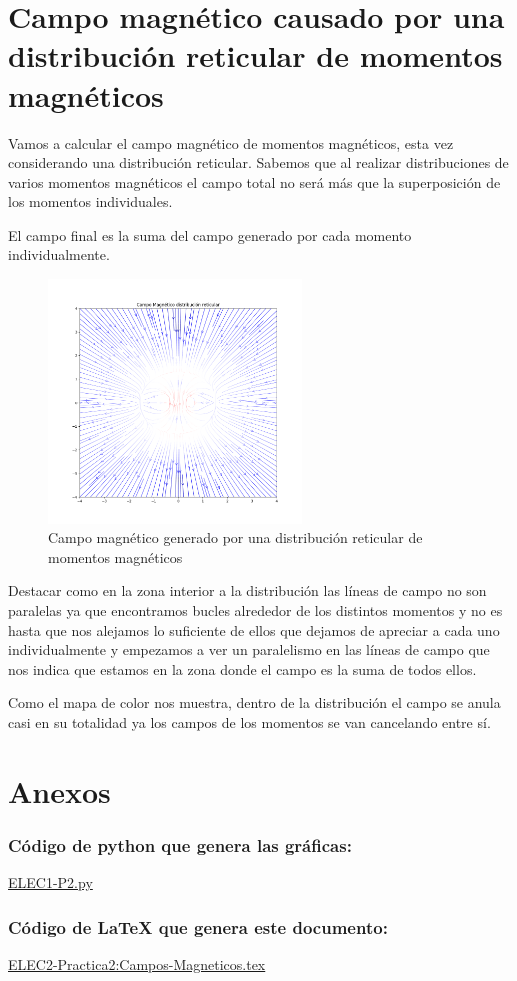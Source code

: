 \documentclass[11pt]{article}
\begin{document}
\section{Campo magnético causado por una distribución reticular de momentos magnéticos}
Vamos a calcular el campo magnético de momentos magnéticos, esta vez considerando una distribución reticular. Sabemos que al realizar distribuciones de varios momentos magnéticos el campo total no será más que la superposición de los momentos individuales. 

\vspace{0.4cm}El campo final es la suma del campo generado por cada momento individualmente.

\begin{figure}[h]
    \vspace{-0.4cm}
    \centering
    \includegraphics[width=0.6\textwidth]{reticular.png}
    \caption{Campo magnético generado por una distribución reticular de momentos magnéticos}
\end{figure}

Destacar como en la zona interior a la distribución las líneas de campo no son paralelas ya que encontramos bucles alrededor de los distintos momentos y no es hasta que nos alejamos lo suficiente de ellos que dejamos de apreciar a cada uno individualmente y empezamos a ver un paralelismo en las líneas de campo que nos indica que estamos en la zona donde el campo es la suma de todos ellos.\vspace{0.4cm}

Como el mapa de color nos muestra, dentro de la distribución el campo se anula casi en su totalidad ya los campos de los momentos se van cancelando entre sí.

\section{Anexos}
\subsubsection*{Código de python que genera las gráficas:}
\href{https://github.com/vmr48-ua/extras/blob/main/ELEC1-P2.py}{ELEC1-P2.py}
\subsubsection*{Código de LaTeX que genera este documento:}
\href{https://www.overleaf.com/read/xmcwycdmwcny}{ELEC2-Practica2:Campos-Magneticos.tex}
\end{document}
